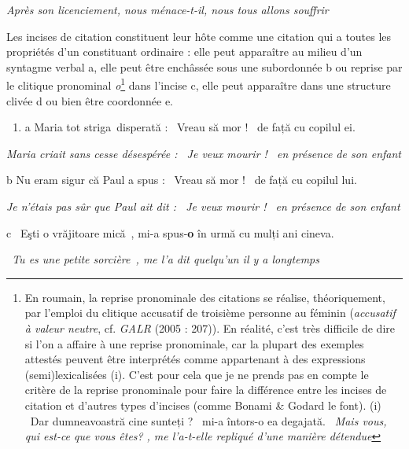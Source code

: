     \textit{Après son licenciement, nous ménace-t-il, nous tous allons souffrir}

Les incises de citation constituent leur hôte comme une citation qui a toutes les propriétés d'un constituant ordinaire : elle peut apparaître au milieu d'un syntagme verbal a, elle peut être enchâssée sous une subordonnée b ou reprise par le clitique pronominal \textit{o}\footnote{En roumain, la reprise pronominale des citations se réalise, théoriquement, par l'emploi du clitique accusatif de troisième personne au féminin (\textit{accusatif à valeur neutre}, cf. \textit{GALR} (2005 : 207)). En réalité, c'est très difficile de dire si l'on a affaire à une reprise pronominale, car la plupart des exemples attestés peuvent être interprétés comme appartenant à des expressions (semi)lexicalisées (i). C'est pour cela que je ne prends pas en compte le critère de la reprise pronominale pour faire la différence entre les incises de citation et d'autres types d'incises (comme Bonami \& Godard le font). 
(i)  {\guillemotleft}~Dar dumneavoastră cine sunteți ?~{\guillemotright} mi-a întors-o ea degajată.
  \textit{{\guillemotleft}~}\textit{Mais vous, qui est-ce que vous êtes?} \textit{{\guillemotright}, me l'a-t-elle repliqué d'une manière détendue} } dans l'incise c, elle peut apparaître dans une structure clivée d ou bien être coordonnée e.


\begin{enumerate}
\item \label{bkm:Ref275445357}a  Maria tot striga~disperată :~{\guillemotleft} Vreau să mor !~{\guillemotright} de față cu copilul ei. 


\end{enumerate}
{\itshape
Maria criait sans cesse désespérée : {\guillemotleft}~Je veux mourir !~{\guillemotright} en présence de son enfant}

  b  Nu eram sigur că Paul a spus : {\guillemotleft}~Vreau să mor !~{\guillemotright} de față cu copilul lui.

{\itshape
Je n'étais pas sûr que Paul ait dit : {\guillemotleft}~Je veux mourir !~{\guillemotright} en présence de son enfant} 

  c  {\guillemotleft}~Eşti o vrăjitoare mică~{\guillemotright}, mi-a spus-\textbf{o} în urmă cu mulți ani cineva.

{\itshape
{\guillemotleft}~Tu es une petite sorcière~{\guillemotright}, me l'a dit quelqu'un il y a longtemps}

